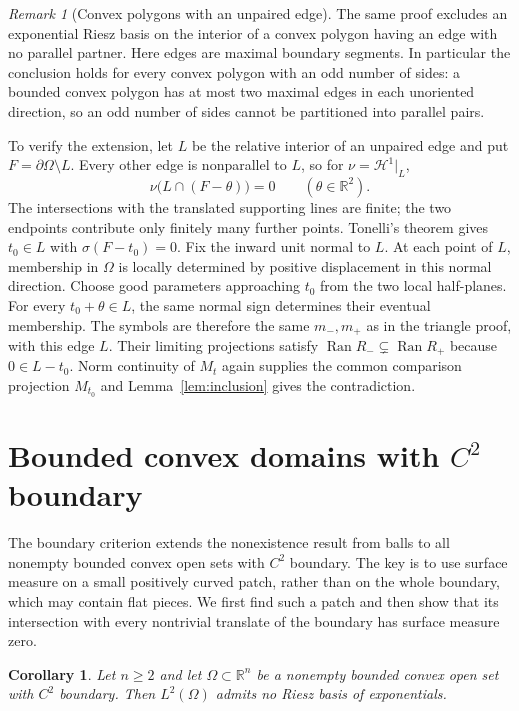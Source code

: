 \documentclass[a4paper,12pt,reqno]{amsart}
\newcommand{\lead}[1]{\par\smallskip\noindent\leavevmode#1\par\smallskip}
\newtheorem{corollary}[theorem]{Corollary}
\theoremstyle{remark}
\newtheorem{remark}[theorem]{Remark}
\numberwithin{equation}{section}
\newcommand{\R}{\mathbb R}
\DeclareMathOperator{\Ran}{Ran}
\begin{document}
\begin{remark}[Convex polygons with an unpaired edge]\label{rem:odd-polygons}
The same proof excludes an exponential Riesz basis on the interior of a
convex polygon having an edge with no parallel partner. Here edges are
maximal boundary segments. In particular the conclusion holds for
every convex polygon with an odd number of sides: a bounded convex polygon
has at most two maximal edges in each unoriented direction, so an odd
number of sides cannot be partitioned into parallel pairs.

To verify the extension, let $L$ be the relative interior of an unpaired
edge and put $F=\partial\Omega\setminus L$. Every other edge is
nonparallel to $L$, so for $\nu=\mathcal H^1|_L$,
\[
 \nu\bigl(L\cap(F-\theta)\bigr)=0\qquad(\theta\in\R^2).
\]
The intersections with the translated supporting lines are finite;
the two endpoints contribute only finitely many further points.
Tonelli's theorem gives $t_0\in L$ with $\sigma(F-t_0)=0$.
Fix the inward unit normal to $L$. At each point of $L$, membership in
$\Omega$ is locally determined by positive displacement
in this normal direction. Choose good parameters approaching $t_0$
from the two local half-planes. For every $t_0+\theta\in L$, the same
normal sign determines their eventual membership. The symbols are
therefore the same $m_-,m_+$ as in the triangle proof, with this edge $L$.
Their limiting projections satisfy $\Ran R_-\subsetneq\Ran R_+$
because $0\in L-t_0$.
Norm continuity of $M_t$ again supplies the common comparison projection
$M_{t_0}$ and Lemma~\ref{lem:inclusion} gives the contradiction.
\end{remark}

\section{Bounded convex domains with \texorpdfstring{$C^2$}{C2} boundary}\label{sec:convex}

\lead{The boundary criterion extends the nonexistence result from balls to
all nonempty bounded convex open sets with $C^2$ boundary. The key is to
use surface measure on a small positively curved patch, rather than on
the whole boundary, which may contain flat pieces. We first find such a
patch and then show that its intersection with every nontrivial translate
of the boundary has surface measure zero.}

\begin{corollary}\label{cor:convex}
Let $n\geq2$ and let $\Omega\subset\R^n$ be a nonempty bounded convex
open set with $C^2$ boundary. Then $L^2(\Omega)$ admits no Riesz basis of
exponentials.
\end{corollary}
\end{document}
